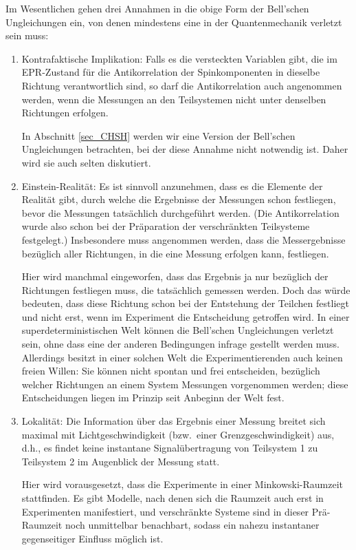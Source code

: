 Im Wesentlichen gehen drei Annahmen in die
obige Form der 
Bell'schen Ungleichungen ein, von denen mindestens
eine in der Quantenmechanik verletzt sein muss:
\begin{enumerate}
\item
Kontrafaktische Implikation: 
Falls es die versteckten Variablen
gibt, die im EPR-Zustand f\"ur die Antikorrelation der 
Spinkomponenten in dieselbe Richtung verantwortlich sind,
so darf die Antikorrelation auch angenommen werden,
wenn die Messungen an den Teilsystemen nicht unter
denselben Richtungen erfolgen.

In Abschnitt \ref{sec_CHSH} werden wir eine Version der
Bell'schen Ungleichungen betrachten, bei der diese
Annahme nicht notwendig ist. Daher wird sie auch selten
diskutiert.
\item
Einstein-Realit\"at: 
Es ist sinnvoll anzunehmen, dass
es die Elemente der Realit\"at gibt, durch welche die
Ergebnisse der Messungen schon festliegen, bevor die
Messungen tats\"achlich durchgef\"uhrt werden. 
(Die Antikorrelation wurde also schon bei der 
Pr\"aparation der verschr\"ankten Teilsysteme
festgelegt.) Insbesondere muss angenommen werden, dass
die Messergebnisse bez\"uglich aller Richtungen, in die
eine Messung erfolgen kann, festliegen. 

Hier wird manchmal eingeworfen, dass das Ergebnis
ja nur bez\"uglich der Richtungen festliegen muss, die
tats\"achlich gemessen werden. Doch das w\"urde bedeuten,
dass diese Richtung schon bei der Entstehung der Teilchen
festliegt und nicht erst, wenn im Experiment die Entscheidung getroffen
wird. In einer \glqq superdeterministischen Welt\grqq{}
k\"onnen die Bell'schen Ungleichungen verletzt sein,
ohne dass eine der anderen Bedingungen infrage gestellt
werden muss. Allerdings besitzt in einer solchen Welt die Experimentierenden
auch keinen \glqq freien Willen\grqq:
Sie k\"onnen nicht spontan und frei entscheiden, bez\"uglich welcher
Richtungen an einem System Messungen vorgenommen werden; diese
Entscheidungen liegen im Prinzip seit Anbeginn der Welt fest.
\item
Lokalit\"at: 
Die Information \"uber das Ergebnis einer
Messung breitet sich maximal mit Lichtgeschwindigkeit
(bzw.\ einer Grenzgeschwindigkeit)
aus, d.h., es findet keine instantane Sig\-nal\-\"uber\-tragung
von Teilsystem 1 zu Teilsystem 2 im Augenblick der
Messung statt.

Hier wird vorausgesetzt, dass die Experimente in
einer Minkowski-Raumzeit stattfinden. Es gibt Modelle, nach denen
sich die Raumzeit auch erst in Experimenten manifestiert, und
verschr\"ankte Systeme sind in dieser \glqq Pr\"a\grqq-Raumzeit noch
unmittelbar benachbart, sodass ein nahezu instantaner gegenseitiger
Einfluss m\"og\-lich ist. 
\end{enumerate}

